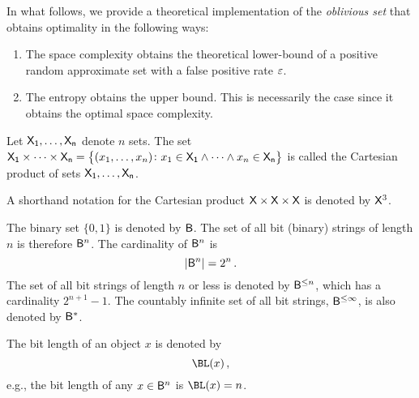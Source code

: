\documentclass[ ../main.tex]{subfiles}
\begin{document}
In what follows, we provide a theoretical implementation of the \emph{oblivious 
set} that obtains optimality in the following ways:
\begin{enumerate}
    \item The space complexity obtains the theoretical lower-bound of a 
    positive random approximate set with a false positive rate $\varepsilon$.
    \item The entropy obtains the upper bound. This is necessarily the case since it obtains the optimal space complexity.
\end{enumerate}


\begin{definition}
Let $\Set{X}[1],\ldots,\Set{X}[n]$ denote $n$ sets. The set $\Set{X}[1] \times \cdots \times \Set{X}[n] = \left\{(x_1,\ldots,x_n) \colon x_1 \in \Set{X}[1] \land \cdots \land x_n \in \Set{X}[n]\right\}$ is called the Cartesian product of sets $\Set{X}[1],\ldots,\Set{X}[n]$.
\end{definition}
A shorthand notation for the Cartesian product $\Set{X} \times \Set{X} \times \Set{X}$ is denoted by $\Set{X}^3$.

The binary set $\{0,1\}$ is denoted by $\Set{B}$. The set of all bit (binary) strings of length $n$ is therefore $\Set{B}^n$. The cardinality of $\Set{B}^n$ is
\begin{equation}
    \Card{\Set{B}^n} = 2^n\,.
\end{equation}
The set of all bit strings of length $n$ or less is denoted by $\Set{B}^{\leq n}$, which has a cardinality $2^{n+1}-1$. The countably infinite set of all bit strings, $\Set{B}^{\leq \infty}$, is also denoted by $\Set{B}^{*}$.

The bit length of an object $x$ is denoted by
\begin{equation}
    \BL(x)\,,
\end{equation}
e.g., the bit length of any $x \in \Set{B}^n$ is $\BL(x) = n$.
\end{document}
